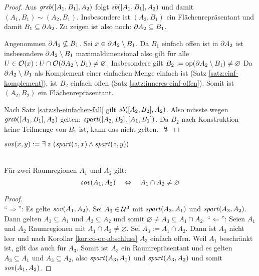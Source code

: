     \begin{proof}
        Aus $\mathit{gr\hspace*{-0.25ex}sb}([A_1,B_1],A_2)$ folgt $\mathit{sb}([A_1,B_1],A_2)$ und damit $(A_1,B_1) \sim (A_2,B_1)$.
        Insbesondere ist $(A_2,B_1)$ ein Flächenrepräsentant und damit $B_1 \subseteq \partial A_2$.
        Zu zeigen ist also noch: $\partial A_2 \subseteq B_1$.

        Angenommen $\partial A_2 \nsubseteq B_1$.
        Sei $x \in \partial A_2 \setminus B_1$. 
        Da $B_1$ einfach offen ist in $\partial A_2$ ist insbesondere $\partial A_2 \setminus B_1$ maximaldimensional also gilt für alle $U \in \mathcal{O}(x): U \cap \mathcal{O}(\partial A_2 \setminus B_1) \neq \varnothing$.
        Insbesondere gilt $B_2 := \text{op}(\partial A_2 \setminus B_1) \neq \varnothing$
        Da $\partial A_2 \setminus B_1$ als Komplement einer einfachen Menge einfach ist (Satz \ref{satz:einf-komplement}), ist $B_2$ einfach offen (Satz \ref{satz:inneres-einf-offen}).
        Somit ist $(A_2,B_2)$ ein Flächenrepräsentant.

        Nach Satz \ref{satz:sb-einfacher-fall} gilt $\mathit{sb}([A_2,B_2],A_2)$.
        Also müsste wegen $\mathit{gr\hspace*{-0.25ex}sb}([A_1,B_1],A_2)$ gelten: $\mathit{spart}([A_2,B_2],[A_1,B_1])$.
        Da $B_2$ nach Konstruktion keine Teilmenge von $B_1$ ist, kann das nicht gelten. $\lightning$
    \end{proof}
    
    
    \begin{erin}
        $\mathit{sov}(x,y) := \exists\: z\ (\mathit{spart}(z,x) \wedge \mathit{spart}(z,y))$
    \end{erin}
    
    \begin{satz}\label{satz:sov-raumreg}\ \\
        Für zwei Raumregionen $A_1$ und $A_2$ gilt: 
        $$\mathit{sov}(A_1,A_2) \quad \Leftrightarrow \quad A_1 \cap A_2 \neq \varnothing$$
    \end{satz}
    
    \begin{proof}\ \\
        ``$\Rightarrow$'':
        Es gelte $\mathit{sov}(A_1,A_2)$. 
        Sei $A_3 \in \mathcal{U}^3$ mit $\mathit{spart}(A_3,A_1)$ und $\mathit{spart}(A_3,A_2)$.
        Dann gelten $A_3 \subseteq A_1$ und $A_3 \subseteq A_2$ und somit $\varnothing \neq A_3 \subseteq A_1 \cap A_2$.
        ``$\Leftarrow$'':
        Seien $A_1$ und $A_2$ Raumregionen mit $A_1 \cap A_2 \neq \varnothing$.
        Sei $A_3 := A_1 \cap A_2$.
        Dann ist $A_3$ nicht leer und nach Korollar \ref{kor:co-oc-abschluss} $A_3$ einfach offen.
        Weil $A_1$ beschränkt ist, gilt das auch für $A_3$.
        Somit ist $A_3$ ein Raumrepräsentant und es gelten $A_3 \subseteq A_1$ und $A_3 \subseteq A_2$, also $\mathit{spart}(A_3,A_1)$ und $\mathit{spart}(A_3,A_2)$ und somit $\mathit{sov}(A_1,A_2)$.
    \end{proof}


